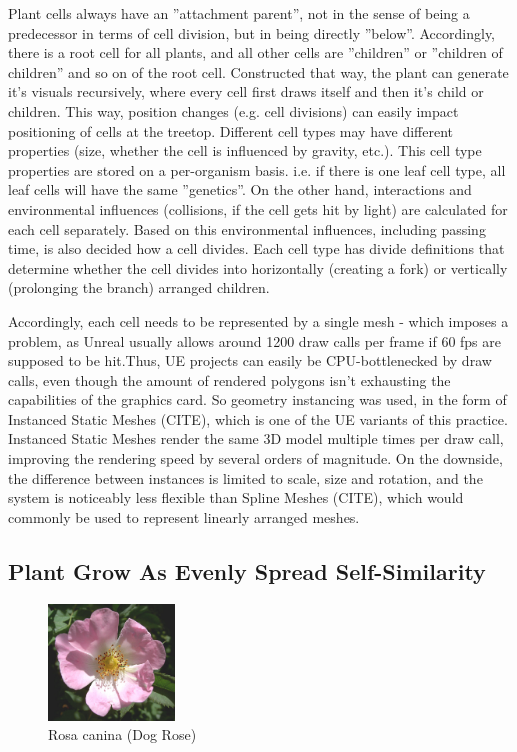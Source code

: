\documentclass[11pt]{scrartcl}
\begin{document}
Plant cells always have an ''attachment parent'', not in the sense of being a predecessor in terms of cell division, but in being directly ''below''. Accordingly, there is a root cell for all plants, and all other cells are ''children'' or ''children of children'' and so on of the root cell. Constructed that way, the plant can generate it's visuals recursively, where every cell first draws itself and then it's child or children. This way, position changes (e.g. cell divisions) can easily impact positioning of cells at the treetop.
Different cell types may have different properties (size, whether the cell is influenced by gravity, etc.). This cell type properties are stored on a per-organism basis. i.e. if there is one leaf cell type, all leaf cells will have the same ''genetics''. On the other hand, interactions and environmental influences (collisions, if the cell gets hit by light) are calculated for each cell separately. Based on this environmental influences, including passing time, is also decided how a cell divides. Each cell type has divide definitions that determine whether the cell divides into horizontally (creating a fork) or vertically (prolonging the branch) arranged children.

Accordingly, each cell needs to be represented by a single mesh - which imposes a problem, as Unreal usually allows around 1200 draw calls per frame if 60 fps are supposed to be hit.Thus, UE projects can easily be CPU-bottlenecked by draw calls, even though the amount of rendered polygons isn’t exhausting the capabilities of the graphics card. So geometry instancing was used, in the form of Instanced Static Meshes (CITE), which is one of the UE variants of this practice. Instanced Static Meshes render the same 3D model multiple times per draw call, improving the rendering speed by several orders of magnitude. On the downside, the difference between instances is limited to scale, size and rotation, and the system is noticeably less flexible than Spline Meshes (CITE), which would commonly be used to represent linearly arranged meshes.

\subsection{Plant Grow As Evenly Spread Self-Similarity} \label{cpt:EvenSelfSim}

\begin{figure} 
 	\centering
 		\includegraphics[width=0.3\textwidth]{Pic_DogRose.png}
 	\caption{Rosa canina (Dog Rose)  \cite{WikipediaDogRose}}
 	\label{fig:DogRose}
\end{figure}
\end{document}
